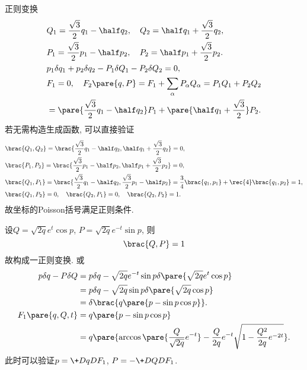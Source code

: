 \documentclass[../LectureNotes.tex]{subfiles}
\begin{document}
\begin{sample}
    \begin{ex}[习题3.17]
        正则变换
        \begin{align*}
            & Q_1 = \frac{\sqrt{3}}{2}q_1 - \half q_2,\quad Q_2 = \half q_1 + \frac{\sqrt{3}}{2}{q_2}, \\
            & P_1 = \frac{\sqrt{3}}{2}p_1 - \half p_2,\quad P_2 = \half p_1 + \frac{\sqrt{3}}{2}p_2. \\
            & p_1\delta q_1 + p_2 \delta q_2 - P_1 \delta Q_1 - P_2 \delta Q_2 = 0, \\
            & F_1 = 0, \quad F_2\pare{q,P} = F_1 + \sum_\alpha P_\alpha Q_\alpha = P_1Q_1 + P_2Q_2 \\ &= \pare{\frac{\sqrt{3}}{2}q_1 - \half q_2}P_1 + \pare{\half q_1 + \frac{\sqrt{3}}{2}}P_2.
        \end{align*}
        若无需构造生成函数, 可以直接验证
        \begin{align*}
            & \brac{Q_1,Q_2} = \brac{\frac{\sqrt{3}}{2}q_1 - \half q_2, \half q_1 + \frac{\sqrt{3}}{2}q_2} = 0, \\
            & \brac{P_1,P_2} = \brac{\frac{\sqrt{3}}{2}p_1 - \half p_2, \half p_1 + \frac{\sqrt{3}}{2}p_2} = 0, \\
            & \brac{Q_1,P_1} = \brac{\frac{\sqrt{3}}{2}q_1 - \half q_2, \frac{\sqrt{3}}{2}p_1 - \half p_2} = \frac{3}{4}\brac{q_1,p_1} + \rec{4}\brac{q_1,p_2} = 1, \\
            & \brac{Q_1,P_2} = 0,\quad \brac{Q_2,P_1} = 0,\quad \brac{Q_2,P_2} = 1.
        \end{align*}
        故坐标的Poisson括号满足正则条件.
    \end{ex}
\end{sample}
\begin{sample}
    \begin{ex}
        设$Q = \sqrt{2q}e^t \cos p$, $P = \sqrt{2q}e^{-t}\sin p$, 则
        \[ \brac{Q,P} = 1 \]
        故构成一正则变换. 或
        \begin{align*}
            p\delta q - P\delta Q &= p\delta q - \sqrt{2q}e^{-t}\sin p\delta\pare{\sqrt{2q}e^t \cos p} \\
            &= p\delta q - \sqrt{2q}\sin p \delta\pare{\sqrt{2q}\cos p} \\
            &= \delta \brac{q\pare{p - \sin p \cos p}}. \\
            F_1\pare{q,Q,t} &= q\pare{p - \sin p \cos p} \\
            &=q\pare{\arccos\pare{\frac{Q}{\sqrt{2q}} e^{-t}} - \frac{Q}{2q}e^{-t}\sqrt{1-\frac{Q^2}{2q}e^{-2t}}}.
        \end{align*}
        此时可以验证$\displaystyle p = \+DqD{F_1}$, $\displaystyle P = -\+D{Q}D{F_1}$.
    \end{ex}
\end{sample}
\end{document}
